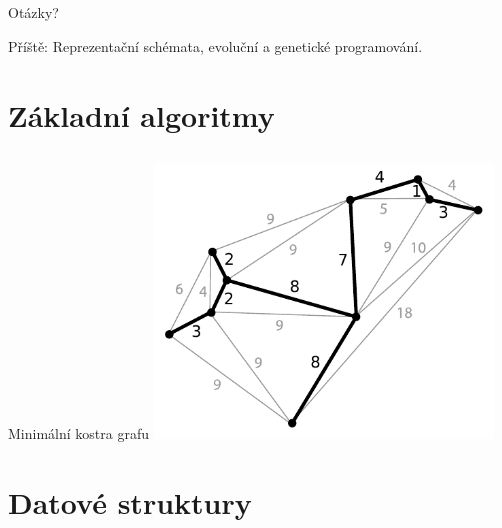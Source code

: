 \documentclass{beamer}
\begin{document}
\subsection{}
\begin{frame}{Otázky?}
\begin{center}
Příště: Reprezentační schémata, evoluční a genetické programování.
\end{center}
\end{frame}

\section{Základní algoritmy}

\subsection{}
\begin{frame}{Minimální kostra grafu}
\includegraphics[width=9cm]{Minimum_spanning_tree.pdf}
\end{frame}

\section{Datové struktury}
\end{document}
